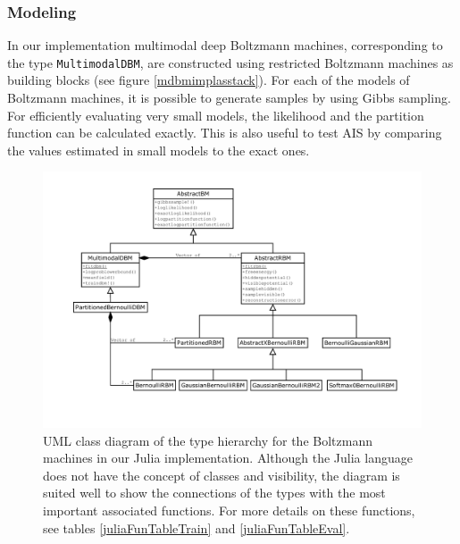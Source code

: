 \documentclass[12pt]{article}
\newcommand{\inlinecode}[1]{\texttt{#1}}
\begin{document}
\subsubsection{Modeling}

In our implementation multimodal deep Boltzmann machines, corresponding to the type \inlinecode{MultimodalDBM}, are constructed using restricted Boltzmann machines as building blocks (see figure \ref{mdbmimplasstack}). For each of the models of Boltzmann machines, it is possible to generate samples by using Gibbs sampling. For efficiently evaluating very small models, the likelihood and the partition function can be calculated exactly. This is also useful to test AIS by comparing the values estimated in small models to the exact ones.


\begin{landscape}
\begin{figure}
   \centering
   \includegraphics[scale=0.41,trim={4cm 4cm 3cm 2.4cm},clip]{images/BoltzmannMachinesDiagram.pdf}
   \caption{UML class diagram \citep{uml} of the type hierarchy for the Boltzmann machines in our Julia implementation. Although the Julia language does not have the concept of classes and visibility, the diagram is suited well to show the connections of the types with the most important associated functions.
   For more details on these functions, see tables \ref{juliaFunTableTrain} and \ref{juliaFunTableEval}.}
   \label{umlclassdiagram}
\end{figure}
\end{landscape}
\end{document}

